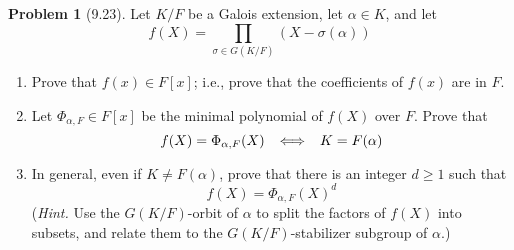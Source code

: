 \documentclass[12pt]{article}
\theoremstyle{definition}
\newtheorem{problem}{Problem}
\begin{document}
\begin{problem}[9.23]
    Let $K/F$ be a Galois extension, let $\alpha \in K$, and let
    \[
        f(X) = \prod_{\sigma \in G(K/F)} (X - \sigma(\alpha))
    \]
    \begin{enumerate}[label=(\alph*)]
        \item Prove that $f(x) \in F[x]$; i.e., prove that the coefficients of $f(x)$ are in $F$.
        \begin{solution}

        \end{solution}

        \item Let $\Phi_{\alpha, F} \in F[x]$ be the minimal polynomial of $f(X)$ over $F$. Prove that
              \[ 
                f(X) = \Phi_{\alpha, F}(X) \hspace{5px} \iff \hspace{5px} K = F(\alpha) 
              \]
        \begin{solution}

        \end{solution}

        \item In general, even if $K \neq F(\alpha)$, prove that there is an integer $d \geq 1$ such that
              \[
                f(X) = \Phi_{\alpha, F}(X)^d
              \]
              (\textit{Hint.} Use the $G(K/F)$-orbit of $\alpha$ to split the factors of $f(X)$ into subsets,
              and relate them to the $G(K/F)$-stabilizer subgroup of $\alpha$.)
        \begin{solution}

        \end{solution}
    \end{enumerate}
\end{problem}
\end{document}
